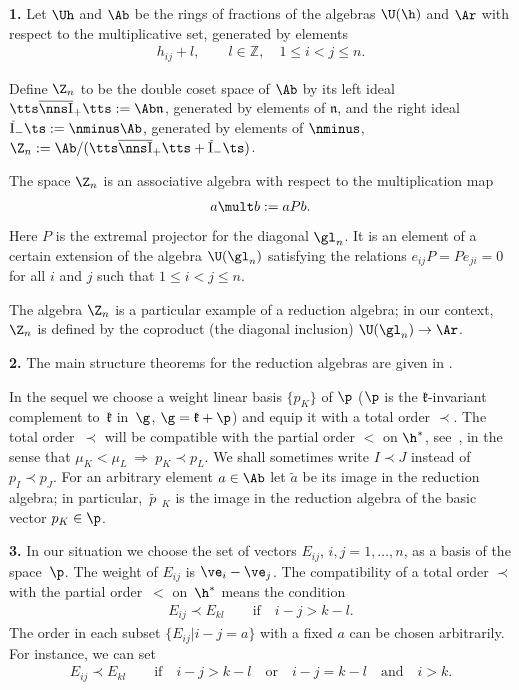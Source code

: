 \documentclass[pdftex]{sigma}
\def\Ib{\tts\overline{\nns\rm I}_+\tts}\def\J{\mathrm{J}}\def\Jb{\,\overline{\!\rm I}_-\ts}\def\k{\mathfrak{k}}
\def\nplus{\mathfrak{n}}\def\nn{\nonumber}\def\nin{\noindent}
\def\pp{\widetilde{\phantom{\,}p\phantom{\,}\phantom{\ }}\phantom{\!}\phantom{\!}\phantom{\!}}
\newcommand{\ZZ}{{\mathbb Z}}\def\Hom{\operatorname{Hom}}\def\I{\mathrm{I}}
\numberwithin{equation}{section}
\begin{document}
{\bf 1.} Let $\Uh$ and $\Ab$ be the rings of fractions of the algebras $\U(\h)$ and $\Ar$ with respect to the multiplicative set, generated by elements
\begin{gather*}
 h_{ij}+l ,\qquad l\in\ZZ  , \quad 1\leq i<j\leq n  .%
 \end{gather*}


Def\/ine $\Z_n$ to be the double coset space of $\Ab$ by its left ideal $\Ib:=\Ab\nplus$, generated by elements of $\nplus$, and the right ideal
$\Jb:=\nminus\Ab$, generated by elements of $\nminus$, $\Z_n:=\Ab/(\Ib+\Jb)$.


The space $\Z_n$ is an associative algebra with respect to the multiplication map
\begin{gather}
\label{not5a}
a\mult b:=aP b  .
\end{gather}
Here $P$ is the extremal projector \cite{AST} for the diagonal $\gl_n$.
It is an element of a certain extension of the algebra $\U(\gl_n)$ satisfying the relations $e_{ij}P=Pe_{ji}=0$ for all $i$ and
$j$ such that $1\leq i<j\leq n$.


The algebra  $\Z_n$ is a particular example of a reduction algebra; in our context, $\Z_n$ is
def\/ined by the coproduct (the diagonal inclusion) $\U(\gl_n)\to\Ar$.

{\bf 2.}  The main structure theorems for the reduction algebras are given in \cite[Section~2]{KO3}.


In the sequel we choose a weight linear basis $\{p_K\}$ of $\p$ ($\p$ is the $\k$-invariant complement to~$\k$ in~$\g$,
$\g =\k +\p$) and equip it with a total order $\prec$. The total order~$\prec$ will be compatible with the partial order $<$ on
$\h^*$, see~, in the sense that $\mu_K<\mu_L\ \Rightarrow \ p_K\prec p_L$. We shall sometimes write
$I\prec J$ instead of $p_I\prec p_J$. For an arbitrary element $a\in\Ab$ let $\widetilde{a}$ be its image in the reduction
algebra; in particular, $\pp_K$ is the image in the reduction algebra of the basic vector $p_K\in\p$.

{\bf 3.} In our situation we choose the set of vectors $E_{ij}$, $i,j=1,\dots ,n$, as a basis of the space~$\p$. The weight of $E_{ij}$ is $\ve_i-\ve_j$.
The compatibility of a total order $\prec$ with the partial order~$<$ on~$\h^*$ means the condition
\begin{gather*}%
E_{ij}\prec E_{kl}\qquad \text{if}\quad i-j>k-l .
\end{gather*}
The order in each subset $\{E_{ij}|i-j=a\}$ with a f\/ixed $a$ can be chosen arbitrarily. For instance, we can set
\begin{gather}\label{not4}
E_{ij}\prec E_{kl}\qquad \text{if}\quad i-j>k-l\quad\text{or}\quad i-j=k-l\quad\text{and}\quad i>k .
\end{gather}
\end{document}
